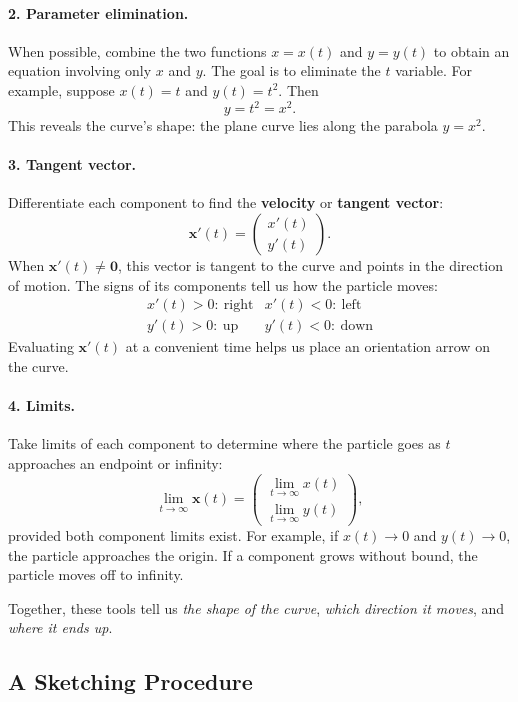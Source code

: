 \documentclass[11pt,letterpaper]{article}
\begin{document}
\paragraph{2. Parameter elimination.}
When possible, combine the two functions $x=x(t)$ and $y=y(t)$
to obtain an equation involving only $x$ and $y$. The goal is to eliminate the $t$ variable.
For example, suppose $x(t)=t$ and $y(t)=t^2$. Then 
\[
y=t^2=x^2.
\]
This reveals the curve's shape: the plane curve lies along the parabola $y=x^2$.

\paragraph{3. Tangent vector.}
Differentiate each component to find the
\textbf{velocity} or \textbf{tangent vector}:
\[
\mathbf{x}'(t)=
\begin{pmatrix}x'(t)\\y'(t)\end{pmatrix}.
\]
When $\mathbf{x}'(t)\ne\mathbf{0}$, this vector is
tangent to the curve and points in the direction of motion.
The signs of its components tell us how the particle moves:
\[
\begin{array}{l|l}
x'(t)>0:\ \text{right} & x'(t)<0:\ \text{left}\\
\hline
y'(t)>0:\ \text{up}    & y'(t)<0:\ \text{down}
\end{array}
\]
Evaluating $\mathbf{x}'(t)$ at a convenient time helps
us place an orientation arrow on the curve.

\paragraph{4. Limits.}
Take limits of each component to determine where the
particle goes as $t$ approaches an endpoint or infinity:
\[
\lim_{t\to\infty}\mathbf{x}(t)
=
\begin{pmatrix}
\displaystyle\lim_{t\to\infty}x(t)\\[2mm]
\displaystyle\lim_{t\to\infty}y(t)
\end{pmatrix},
\]
provided both component limits exist.
For example, if $x(t)\to0$ and $y(t)\to0$, the
particle approaches the origin. If a component grows
without bound, the particle moves off to infinity.

Together, these tools tell us \textit{the shape of the curve},
\textit{which direction it moves}, and \textit{where it ends up}.

\subsection{A Sketching Procedure}
\end{document}

